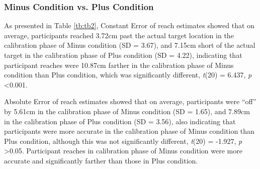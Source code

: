 \subsubsection{Minus Condition vs. Plus Condition}
As presented in Table \ref{tb:tb2}, Constant Error of reach estimates showed that on average, participants reached 3.72cm past the actual target location in the calibration phase of Minus condition (SD = 3.67), and 7.15cm short of the actual target in the calibration phase of Plus condition (SD = 4.22), indicating that participant reaches were 10.87cm farther in the calibration phase of Minus condition than Plus condition, which was significantly different, \textit{t}(20) = 6.437, \textit{p} \textless 0.001.

Absolute Error of reach estimates showed that on average, participants were “off” by 5.61cm in the calibration phase of Minus condition (SD = 1.65), and 7.89cm in the calibration phase of Plus condition (SD = 3.56), also indicating that participants were more accurate in the calibration phase of Minus condition than Plus condition, although this was not significantly different, \textit{t}(20) = -1.927, \textit{p} \textgreater 0.05. Participant reaches in calibration phase of Minus condition were more accurate and significantly farther than those in Plus condition.

